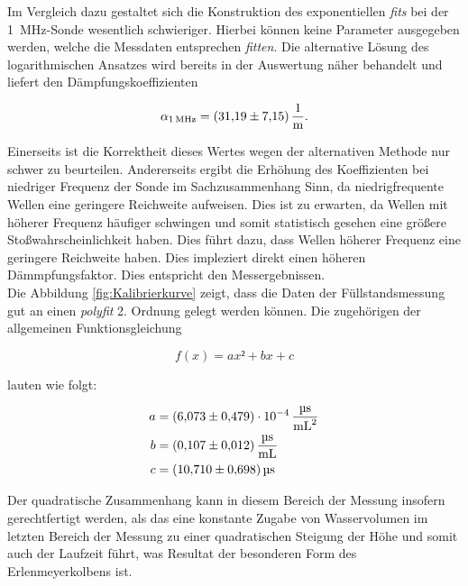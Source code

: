 \noindent Im Vergleich dazu gestaltet sich die Konstruktion des exponentiellen \emph{fits} bei der \qty{1}{\mega\hertz}-Sonde wesentlich 
schwieriger. Hierbei können keine Parameter ausgegeben werden, welche die Messdaten entsprechen \emph{fitten}. Die alternative Lösung des 
logarithmischen Ansatzes wird bereits in der Auswertung näher behandelt und liefert den Dämpfungskoeffizienten

\begin{align*}
    \alpha_{\qty{1}{\mega\hertz}} = \qty{31.19\pm7.15}{\per\meter}.
\end{align*}

\noindent Einerseits ist die Korrektheit dieses Wertes wegen der alternativen Methode nur schwer zu beurteilen. Andererseits 
ergibt die Erhöhung des Koeffizienten bei niedriger Frequenz der Sonde im Sachzusammenhang Sinn, da niedrigfrequente Wellen 
eine geringere Reichweite aufweisen. Dies ist zu erwarten, da Wellen mit höherer Frequenz häufiger schwingen und somit statistisch 
gesehen eine größere Stoßwahrscheinlichkeit haben. Dies führt dazu, dass Wellen höherer Frequenz eine geringere Reichweite haben. Dies 
impleziert direkt einen höheren Dämmpfungsfaktor. Dies entspricht den Messergebnissen.\\

\noindent Die Abbildung \ref{fig:Kalibrierkurve} zeigt, dass die Daten der Füllstandsmessung gut an einen \emph{polyfit} 2.
Ordnung gelegt werden können. Die zugehörigen der allgemeinen Funktionsgleichung

\begin{equation*}
    f(x) = ax² + bx + c
\end{equation*}

\noindent lauten wie folgt:

\begin{align*}
    a &= \qty{6.073\pm0.479e-4}{\micro\second\per\milli\liter\squared}\\  
    b &= \qty{0.107\pm0.012}{\micro\second\per\milli\liter}\\
    c &= \qty{10.71\pm0.698}{\micro\second }
\end{align*}

\noindent Der quadratische Zusammenhang kann in diesem Bereich der Messung insofern gerechtfertigt werden, als das eine konstante 
Zugabe von Wasservolumen im letzten Bereich der Messung zu einer quadratischen Steigung der Höhe und somit auch der Laufzeit 
führt, was Resultat der besonderen Form des Erlenmeyerkolbens ist. 

